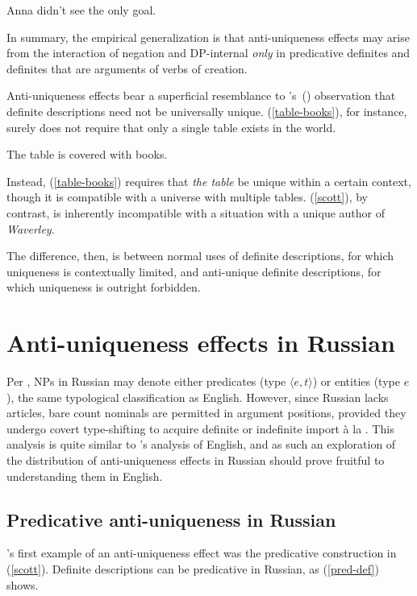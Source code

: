 \documentclass{article}
\newcommand{\citegen}[1]{\citeauthor{#1}'s~(\citeyear{#1})}
\begin{document}
\begin{exe}
	\ex \label{see-only-goal} Anna didn't see the only goal.
\end{exe}

In summary, the empirical generalization is that anti-uniqueness effects may arise from the interaction of negation and DP-internal \textit{only} in predicative definites and definites that are arguments of verbs of creation.

Anti-uniqueness effects bear a superficial resemblance to \citegen{strawson50} observation that definite descriptions need not be universally unique. (\ref{table-books}), for instance, surely does not require that only a single table exists in the world.

\begin{exe}
	\ex \label{table-books} The table is covered with books.
\end{exe}

Instead, (\ref{table-books}) requires that \textit{the table} be unique within a certain context, though it is compatible with a universe with multiple tables. (\ref{scott}), by contrast, is inherently incompatible with a situation with a unique author of \textit{Waverley}.

The difference, then, is between normal uses of definite descriptions, for which uniqueness is contextually limited, and anti-unique definite descriptions, for which uniqueness is outright forbidden.




\section{Anti-uniqueness effects in Russian \label{sec:anti-uniqueness-ru}}
Per \citet{chierchia98}, NPs in Russian may denote either predicates (type $\langle e, t \rangle$) or entities (type $e$), the same typological classification as English. However, since Russian lacks articles, bare count nominals are permitted in argument positions, provided they undergo covert type-shifting to acquire definite or indefinite import \`{a} la \citet{partee86}. This analysis is quite similar to \citeauthor{cb2015}'s analysis of English, and as such an exploration of the distribution of anti-uniqueness effects in Russian should prove fruitful to understanding them in English.

\subsection{Predicative anti-uniqueness in Russian}
\citeauthor{cb2015}'s first example of an anti-uniqueness effect was the predicative construction in (\ref{scott}). Definite descriptions can be predicative in Russian, as (\ref{pred-def}) shows.
\end{document}
